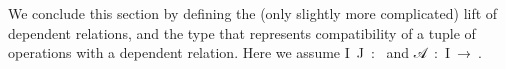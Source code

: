 We conclude this section by defining the (only slightly more complicated) lift of dependent relations, and the type that represents compatibility of a tuple of operations with a dependent relation. Here we assume \ab I~\ab J~\as :~
and \ab 𝒜~\as :~\ab I~\as →~.
\ccpad
\begin{code}%
\>[0][@{}l@{\AgdaIndent{0}}]%
\>[1]\AgdaSpace{}%
\AgdaSymbol{:}\AgdaSpace{}%
\AgdaSpace{}%
\AgdaSpace{}%
\AgdaSpace{}%
\AgdaSpace{}%
\AgdaSpace{}%
\AgdaSpace{}%
\AgdaSpace{}%
\AgdaSpace{}%
\AgdaSymbol{(}\AgdaSpace{}%
\AgdaSpace{}%
\AgdaSpace{}%
\AgdaSymbol{))}\AgdaSpace{}%
\AgdaSpace{}%
\AgdaSpace{}%
\AgdaSpace{}%
\AgdaSpace{}%
\<%
\\
%
\>[1]\AgdaSpace{}%
\AgdaSpace{}%
\AgdaSpace{}%
\AgdaSymbol{=}\AgdaSpace{}%
\AgdaSpace{}%
\AgdaSpace{}%
\AgdaSpace{}%
\AgdaSpace{}%
\AgdaSpace{}%
\AgdaSpace{}%
\AgdaSpace{}%
\AgdaSymbol{(}\AgdaSpace{}%
\AgdaSymbol{)}\AgdaSpace{}%
\AgdaSymbol{)}\<%
\\
%
\\[\AgdaEmptyExtraSkip]%
%
\>[1]\AgdaSpace{}%
\AgdaSymbol{:}\AgdaSpace{}%
\AgdaSpace{}%
\AgdaSpace{}%
\AgdaSpace{}%
\AgdaSpace{}%
\AgdaSpace{}%
\AgdaSymbol{(}\AgdaSpace{}%
\AgdaSymbol{))}\AgdaSpace{}%

\end{code}

